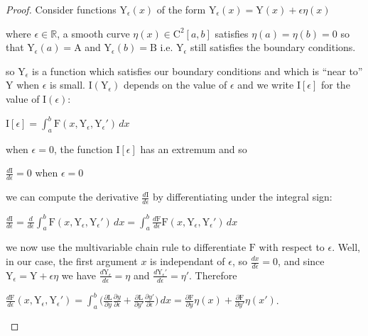 \documentclass[a4paper]{book}
\numberwithin{theorem}{section}%
\begin{document}
\begin{proof}
    Consider functions $\mathrm{Y}_{\epsilon}(x)$ of the form $\mathrm{Y}_{\epsilon}(x)=\mathrm{Y}(x)+\epsilon\eta(x)$

    where $\epsilon\in\mathbb{R}$, a smooth curve $\eta(x)\in \mathrm{C}^{2}[a,b]$ satisfies $\eta(a)=\eta(b)=0$ so that $\mathrm{Y}_{\epsilon}(a)=\mathrm{A}$ and $\mathrm{Y}_{\epsilon}(b)=\mathrm{B}$ i.e. $\mathrm{Y}_{\epsilon}$ still satisfies the boundary conditions.

    so $\mathrm{Y}_{\epsilon}$ is a function which satisfies our boundary conditions and which is ``near to'' $\mathrm{Y}$ when $\epsilon$ is small. $\mathrm{I}(\mathrm{Y}_{\epsilon})$ depends on the value of $\epsilon$ and we write $\mathrm{I}[\epsilon]$ for the value of $\mathrm{I}(\epsilon)$:
    \begin{center}
        $\displaystyle \mathrm{I}[\epsilon]=\int_{a}^{b}\mathrm{F}(x,\mathrm{Y}_{\epsilon},\mathrm{Y}_{\epsilon}')\,dx$
    \end{center}
    when $\epsilon=0$, the function $\mathrm{I}[\epsilon]$ has an extremum and so
    \begin{center}
        $\displaystyle \frac{d\mathrm{I}}{d\epsilon}=0$ when $\epsilon=0$ 
    \end{center}
    we can compute the derivative $\displaystyle \frac{d\mathrm{I}}{d\epsilon}$ by differentiating under the integral sign:
    \begin{center}
        $\displaystyle \frac{d\mathrm{I}}{d\epsilon}=\frac{d}{d\epsilon}\int_{a}^{b}\mathrm{F}(x,\mathrm{Y}_{\epsilon},\mathrm{Y}_{\epsilon}')\,dx=\int_{a}^{b}\frac{d\mathrm{F}}{d\epsilon}\mathrm{F}(x,\mathrm{Y}_{\epsilon},\mathrm{Y}_{\epsilon}')\,dx$
    \end{center}
    we now use the multivariable chain rule to differentiate $\mathrm{F}$ with respect to $\epsilon$. Well, in our case, the first argument $x$ is independant of $\epsilon$, so $\displaystyle \frac{dx}{d\epsilon}=0$, and since $\mathrm{Y}_{\epsilon}=\mathrm{Y}+\epsilon\eta$ we have $\displaystyle \frac{d\mathrm{Y}_{\epsilon}}{d\epsilon}=\eta$ and $\displaystyle \frac{d\mathrm{Y}_{\epsilon}'}{d\epsilon}=\eta'$. Therefore
    \begin{center}
        $\displaystyle \frac{d\mathrm{F}}{d\epsilon}(x,\mathrm{Y}_{\epsilon},\mathrm{Y}_{\epsilon}')=\int_{a}^{b}\Big(\frac{\partial\mathrm{L}}{\partial y}\frac{\partial y}{\partial \epsilon}+\frac{\partial\mathrm{L}}{\partial y'}\frac{\partial y'}{\partial \epsilon}\Big)\,dx=\frac{\partial\mathrm{F}}{\partial y}\eta(x)+\frac{\partial\mathrm{F}}{\partial y'}\eta(x')$.

\end{center}
\end{proof}
\end{document}
